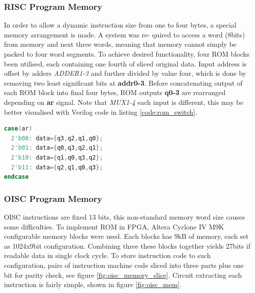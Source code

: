 \subsubsection{RISC Program Memory}
In order to allow a dynamic instruction size from one to four bytes, a special memory arrangement is made. A system was re-
quired to access a word (8bits) from memory and next three words, meaning that memory cannot simply be packed to four word segments. To achieve desired functionality, four ROM blocks been utilised, each containing one fourth of sliced original data. Input address is offset by adders \textit{ADDER1-3} and further divided by value four, which is done by removing two least significant bits at \textbf{addr0-3}. 
Before concatenating output of each ROM block into final four bytes, ROM outputs \textbf{q0-3} are rearranged depending on \textbf{ar} signal. Note that \textit{MUX1-4} each input is different, this may be better visualised with Verilog code in listing \ref{code:rom_switch}.


\begin{blockpage}
\begin{lstlisting}[frame=single, language=Verilog, caption={RISC sliced ROM memory multiplexer arrangement Verilog code}, emph={ar, data}, label=code:rom_switch]
case(ar)
  2'b00: data={q3,q2,q1,q0};
  2'b01: data={q0,q3,q2,q1};
  2'b10: data={q1,q0,q3,q2};
  2'b11: data={q2,q1,q0,q3};
endcase
\end{lstlisting}
\end{blockpage}

\subsubsection{OISC Program Memory}\label{subsec:oisc_mem}
OISC instructions are fixed 13 bits, this non-standard memory word size causes some difficulties. To implement ROM in FPGA, Altera Cyclone IV M9K configurable memory blocks were used. Each blocks has 9kB of memory, each set as 1024x9bit configuration. Combining three these blocks together yields 27bits if readable data in single clock cycle. To store instruction code to such configuration, pairs of instruction machine code sliced into three parts plus one bit for parity check, see figure \ref{fig:oisc_memory_slice}. Circuit extracting each instruction is fairly simple, shown in figure \ref{fig:oisc_mem}.

